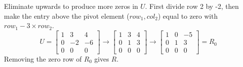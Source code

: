 \noindent Eliminate upwards to produce more zeros in $U$. First divide row 2 by -2, then make the entry above the pivot element ($row_1, col_2$) equal to zero with $row_1 - 3 \times row_2$.
\[
	U = \begin{bmatrix}
		1 & 3  & 4  \\
		0 & -2 & -6 \\
		0 & 0  & 0
	\end{bmatrix}
	\rightarrow
	\begin{bmatrix}
		1 & 3 & 4 \\
		0 & 1 & 3 \\
		0 & 0 & 0
	\end{bmatrix}
	\rightarrow
	\begin{bmatrix}
		1 & 0 & -5 \\
		0 & 1 & 3  \\
		0 & 0 & 0
	\end{bmatrix}
	= R_0
\]
Removing the zero row of $R_0$ gives $R$.